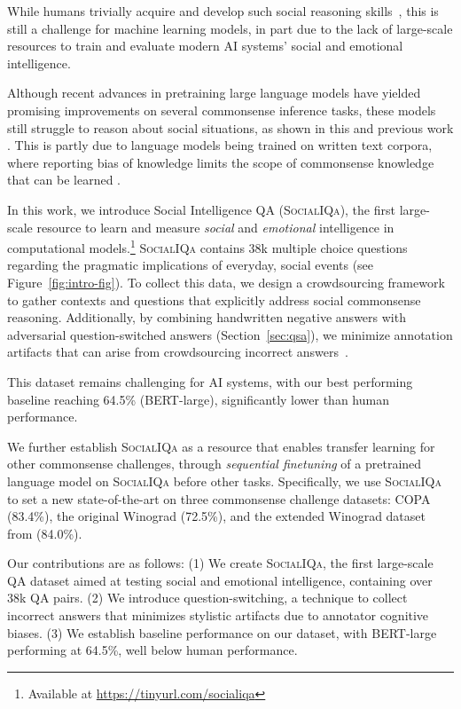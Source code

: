 While humans trivially acquire and develop such social reasoning skills~\cite{moore2013development}, this is still a challenge for machine learning models, in part due to the lack of large-scale resources to train and evaluate modern AI systems' social and emotional intelligence.

Although recent advances in pretraining large language models have yielded promising improvements on several commonsense inference tasks, these models still struggle to reason about social situations, as shown in this and previous work \cite{Davis2015CommonsenseRA,Nematzadeh2018EvaluatingToM,Talmor2019commonsenseQA}. This is partly due to language models being trained on written text corpora, where reporting bias of knowledge limits the scope of commonsense knowledge that can be learned \cite{Gordon2013reportingbias,Lucy2017AreDR}.

In this work, we introduce Social Intelligence QA (\textsc{SocialIQa}), the first large-scale resource to learn and measure \textit{social} and \textit{emotional} intelligence in computational models.\footnote{Available at \url{https://tinyurl.com/socialiqa}}
\textsc{SocialIQa} contains 38k multiple choice questions regarding the pragmatic implications of everyday, social events (see Figure~\ref{fig:intro-fig}).  To collect this data, we design a crowdsourcing framework to gather contexts and questions that explicitly address social commonsense reasoning. Additionally, by combining handwritten negative answers with adversarial question-switched answers (Section~\ref{sec:qsa}), we minimize annotation artifacts that can arise from crowdsourcing incorrect answers~\cite{Schwartz2017effect,Gururangan2018AnnotationAI}. 

This dataset remains challenging for AI systems, with our best performing baseline reaching 64.5\% (BERT-large), significantly lower than human performance.

We further establish \textsc{SocialIQa} as a resource that enables transfer learning for other commonsense challenges, through \textit{sequential finetuning} of a pretrained language model on \textsc{SocialIQa} before other tasks. Specifically, we use \textsc{SocialIQa} to set a new state-of-the-art on three commonsense challenge datasets: COPA \cite{Roemmele2011ChoiceOP} (83.4\%), the original Winograd \citep{Levesque2011TheWS} (72.5\%), and the extended Winograd dataset from \citet{Rahman2012DPR} (84.0\%). 

Our contributions are as follows: (1) We create \textsc{SocialIQa},
the first large-scale QA dataset aimed at testing social and emotional intelligence, containing over 38k QA pairs. (2) We introduce question-switching, a technique to collect incorrect answers that minimizes stylistic artifacts due to annotator cognitive biases. (3) We establish baseline performance on our dataset, with BERT-large performing at 64.5\%, well below human performance.

